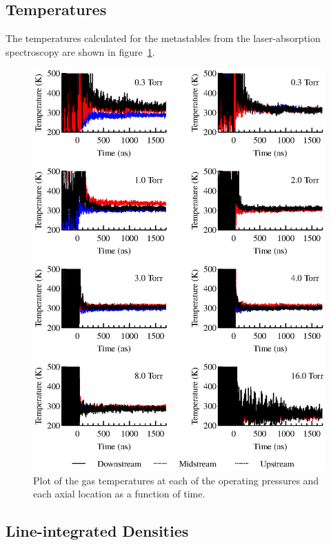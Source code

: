 \subsection{Temperatures}

The temperatures calculated for the metastables from the laser-absorption
spectroscopy are shown in figure~\ref{fig:temperatures}.
\begin{figure}
  \centering
  \includegraphics{./chapters/metastables/figures/temperatures.eps}
  \caption{Plot of the gas temperatures at each of the operating
  pressures and each axial location as a function of time.}
  \label{fig:temperatures}
\end{figure}

\subsection{Line-integrated Densities}

